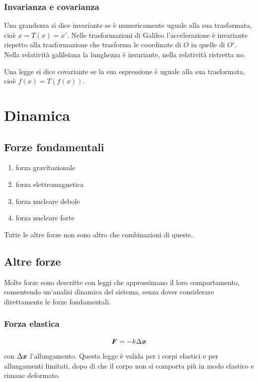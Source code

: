 \subsection{Invarianza e covarianza}
Una grandezza si dice invariante se è numericamente uguale alla sua trasformata, cioè $x=T(x)=x'$. Nelle trasformazioni di Galileo l'accelerazione è invariante rispetto alla trasformazione che trasforma le coordinate di $O$ in quelle di $O'$. Nella relatività galileiana la lunghezza è invariante, nella relatività ristretta no.

Una legge si dice covariante se la sua espressione è uguale alla sua trasformata, cioè $f(x)=T(f(x))$.




\chapter{Dinamica}

\section{Forze fondamentali}
\begin{enumerate}
\item forza gravitazionale
\item forza elettromagnetica
\item forza nucleare debole
\item forza nucleare forte
\end{enumerate}
Tutte le altre forze non sono altro che combinazioni di queste.
\section{Altre forze}
Molte forze sono descritte con leggi che approssimano il loro comportamento, consentendo un'analisi dinamica del sistema, senza dover considerare direttamente le forze fondamentali.

\subsection{Forza elastica}
\begin{legge}[Hook]
\begin{equation*}
\boldsymbol{F}=-k\Delta\boldsymbol{x}
\end{equation*}
 con $\Delta\boldsymbol{x}$ l'allungamento. Questa legge è valida per i corpi elastici e per allungamenti limitati, dopo di che il corpo non si comporta più in modo elastico e rimane deformato.
\end{legge}


